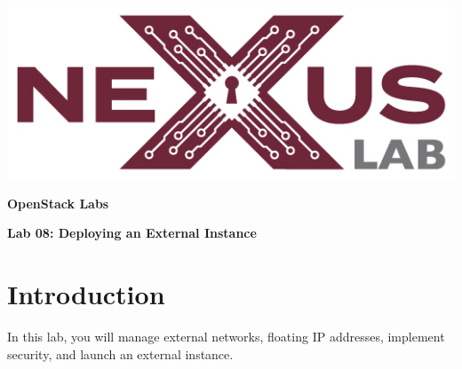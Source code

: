 \documentclass[letterpaper, 12pt]{article}
\begin{document}
\begin{titlepage}
    \centering
    \includegraphics[scale=0.5]{images/nexus_lab_logo.png}

    \vspace*{\baselineskip}

    \textbf{\Large OpenStack Labs}

    \vspace*{\baselineskip}

    \textbf{\Large Lab 08: Deploying an External Instance}
    \vspace*{\fill}
\end{titlepage}

{
    \fancyhf{}
    \fancyfoot[R]{\footnotesize\thepage}
    \renewcommand{\headrulewidth}{0pt}
}

\pagestyle{fancy}
\tableofcontents
\clearpage

\section*{Introduction}
\label{sec:introduction}
In this lab, you will manage external networks, floating IP addresses, implement security, and launch an external
instance.
\end{document}
